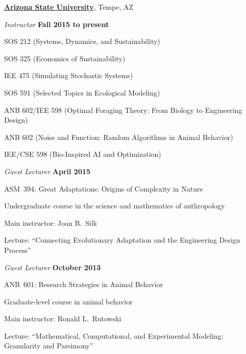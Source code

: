 \documentclass[10pt]{article}
\begin{document}
\href{http://www.asu.edu/}{\textbf{Arizona State University}},
Tempe, AZ
\begin{outerlist}

\item[] \textit{Instructor} \hfill \textbf{Fall 2015 to present}
    \begin{innerlist}
        \item SOS 212 (Systems, Dynamics, and Sustainability)
        \item SOS 325 (Economics of Sustainability)
        \item IEE 475 (Simulating Stochastic Systems)
        \item SOS 591 (Selected Topics in Ecological Modeling)
        \item ANB 602/IEE 598
            (Optimal Foraging Theory: From Biology to Engineering Design)
        \item ANB 602
            (Noise and Function: Random Algorithms in Animal Behavior)
        \item IEE/CSE 598
            (Bio-Inspired AI and Optimization)
    \end{innerlist}

\item[] \textit{Guest Lecturer} \hfill \textbf{April 2015}
    \begin{innerlist}
        \item ASM~394: Great Adaptations: Origins of Complexity in Nature
        \begin{innerlist}
            \item Undergraduate course in the science and mathematics of anthropology
            \item Main instructor: Joan B.~Silk
            \item Lecture: ``Connecting Evolutionary Adaptation and the Engineering Design Process''
        \end{innerlist}
    \end{innerlist}

\item[] \textit{Guest Lecturer} \hfill \textbf{October 2013}
    \begin{innerlist}
        \item ANB~601: Research Strategies in Animal Behavior
        \begin{innerlist}
            \item Graduate-level course in animal behavior
            \item Main instructor: Ronald L.~Rutowski
            \item Lecture: ``Mathematical, Computational, and Experimental Modeling: Granularity and Parsimony''
        \end{innerlist}
    \end{innerlist}

\end{outerlist}
\end{document}
